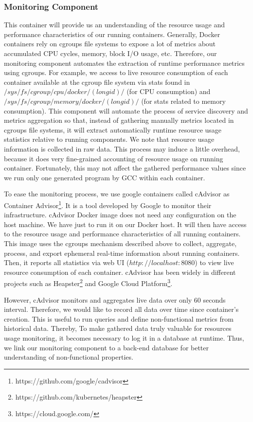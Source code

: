 \subsubsection{Monitoring Component}
This container will provide us an understanding of the resource usage and performance characteristics of our running containers. Generally, Docker containers rely on cgroups file systems to expose a lot of metrics about accumulated CPU cycles, memory, block I/O usage, etc. Therefore, our monitoring component automates the extraction of runtime performance metrics using cgroups. For example, we access to live resource consumption of each container available at the cgroup file system via stats found in $/sys/fs/cgroup/cpu/docker/(longid)/$ (for CPU consumption) and $/sys/fs/cgroup/memory/docker/(longid)/$ (for stats related to memory consumption). This component will automate the process of service discovery and metrics aggregation so that, instead of gathering manually metrics located in cgroups file systems, it will extract automatically runtime resource usage statistics relative to running components. We note that resource usage information is collected in raw data. This process may induce a little overhead, because it does very fine-grained accounting of resource usage on running container. Fortunately, this may not affect the gathered performance values since we run only one generated program by GCC within each container.

To ease the monitoring process, we use google containers called cAdvisor as Container Advisor\footnote{https://github.com/google/cadvisor}. It is a tool developed by Google to monitor their infrastructure. 
cAdvisor Docker image does not need any configuration on the host machine. We have just to run it on our Docker host. It will then have access to the resource usage and performance characteristics of all running containers. This image uses the cgroups mechanism described above to collect, aggregate, process, and export ephemeral real-time information about running containers. Then, it reports all statistics via web UI ($http://localhost:8080$) to view live resource consumption of each container. cAdvisor has been widely in different projects such as Heapster\footnote{https://github.com/kubernetes/heapster} and Google Cloud Platform\footnote{https://cloud.google.com/}.

However, cAdvisor monitors and aggregates live data over only 60 seconds interval. Therefore, we would like to record all data over time since container's creation. This is useful to run queries and define non-functional metrics from historical data. Thereby, To make gathered data truly valuable for resources usage monitoring, it becomes necessary to log it in a database at runtime. Thus, we link our monitoring component to a back-end database for better understanding of non-functional properties. 

